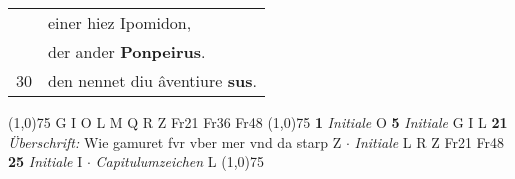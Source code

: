 \documentclass[8pt,a4paper,notitlepage]{article}
\begin{document}
\begin{table}[ht]
\begin{minipage}[t]{0.5\linewidth}
\begin{tabular}{rl}
 & einer hiez Ipomidon,\\ 
 & der ander \textbf{Ponpeirus}.\\ 
30 & den nennet diu âventiure \textbf{sus}.\\ 
\end{tabular}
\scriptsize
\line(1,0){75} \newline
G I O L M Q R Z Fr21 Fr36 Fr48 \newline
\line(1,0){75} \newline
\textbf{1} \textit{Initiale} O  \textbf{5} \textit{Initiale} G I L  \textbf{21} \textit{Überschrift:} Wie gamuret fvr vber mer vnd da starp Z   $\cdot$ \textit{Initiale} L R Z Fr21 Fr48  \textbf{25} \textit{Initiale} I   $\cdot$ \textit{Capitulumzeichen} L  \newline
\line(1,0){75} \newline

\end{minipage}
\end{table}
\end{document}
